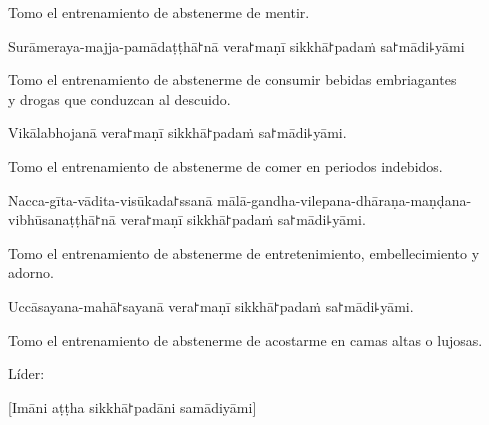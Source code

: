 \begin{english}
  Tomo el entrenamiento de abstenerme de mentir.
\end{english}

\begin{precept}
  \setcounter{enumi}{4}
  \item Surāmeraya-majja-pamādaṭṭhā꜓nā vera꜓maṇī sikkhā꜓padaṁ sa꜓mādi꜕yāmi
\end{precept}

\begin{english}
  Tomo el entrenamiento de abstenerme de consumir bebidas embriagantes\\
  y drogas que conduzcan al descuido.
\end{english}

\begin{precept}
  \setcounter{enumi}{5}
  \item Vikālabhojanā vera꜓maṇī sikkhā꜓padaṁ sa꜓mādi꜕yāmi.
\end{precept}

\begin{english}
  Tomo el entrenamiento de abstenerme de comer en periodos indebidos.
\end{english}

\begin{precept}
  \setcounter{enumi}{6}
  \item Nacca-gīta-vādita-visūkada꜓ssanā mālā-gandha-vilepana-dhāraṇa-maṇḍana-vibhūsanaṭṭhā꜓nā vera꜓maṇī sikkhā꜓padaṁ sa꜓mādi꜕yāmi.
\end{precept}

\begin{english}
  Tomo el entrenamiento de abstenerme de entretenimiento, embellecimiento y adorno.
\end{english}

\begin{precept}
  \setcounter{enumi}{7}
  \item Uccāsayana-mahā꜓sayanā vera꜓maṇī sikkhā꜓padaṁ sa꜓mādi꜕yāmi.
\end{precept}

\begin{english}
  Tomo el entrenamiento de abstenerme de acostarme en camas altas o lujosas.
\end{english}

\begin{instruction}
	Líder:
\end{instruction}

[Imāni aṭṭha sikkhā꜓padāni samādiyāmi]\\

